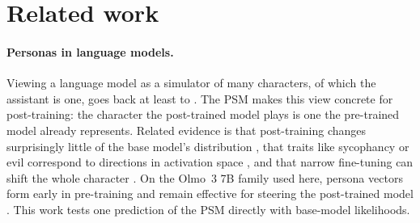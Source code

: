 \documentclass{article}
\begin{document}
\section{Related work}
\label{sec:related}

\paragraph{Personas in language models.}
Viewing a language model as a simulator of many characters, of which the assistant is one, goes back at least to \citet{janus2022simulators,andreas2022agent,shanahan2023roleplay}.
The PSM \citep{marks2026psm} makes this view concrete for post-training: the character the post-trained model plays is one the pre-trained model already represents.
Related evidence is that post-training changes surprisingly little of the base model's distribution \citep{zhou2023lima,lin2023unlocking}, that traits like sycophancy or evil correspond to directions in activation space \citep{chen2025persona}, and that narrow fine-tuning can shift the whole character \citep{betley2025emergent}.
On the Olmo~3 7B family used here, persona vectors form early in pre-training and remain effective for steering the post-trained model \citep{moskvoretskii2026persona}.
This work tests one prediction of the PSM directly with base-model likelihoods.
\end{document}
